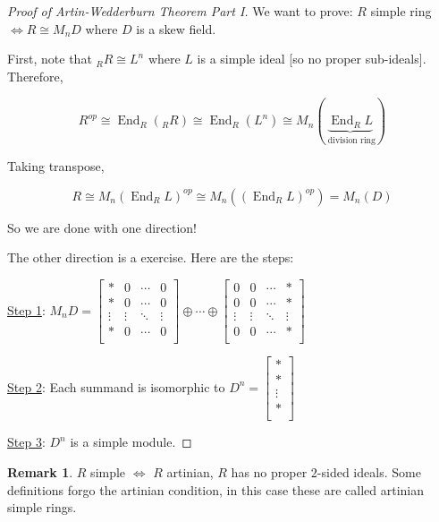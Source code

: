 \documentclass{article}
\theoremstyle{definition}
\newtheorem*{remark}{Remark}
\newcommand{\End}{\operatorname{End}}
\begin{document}
\begin{proof}
    [Proof of Artin-Wedderburn Theorem Part I]

    We want to prove: \(R\) simple ring \(\iff R \cong M_n D\) where \(D\) is a skew field.

    First, note that \(_R R \cong L^n\) where \(L\) is a simple ideal [so no proper sub-ideals]. Therefore,

    \[
        R^{op} \cong  \End_R (_R R) \cong \End_R (L^n) \cong M_n(\underbrace{\End_R L}_{\text{ division ring} })
    \]

    Taking transpose,

    \[
        R \cong M_n(\End_R L)^{op} \cong M_n((\End_R L)^{op}) =M_n(D)
    \]

    So we are done with one direction!

    The other direction is a exercise. Here are the steps:

    \underline{Step 1}: \(M_n D = \begin{bmatrix}
        \ast & 0 & \cdots &  0 \\
        \ast & 0 & \cdots &  0 \\
        \vdots & \vdots & \ddots &  \vdots \\
        \ast & 0 & \cdots &  0 \\
    \end{bmatrix} \oplus \cdots \oplus \begin{bmatrix}
        0 & 0 & \cdots &  \ast \\
        0 & 0 & \cdots &  \ast \\
        \vdots & \vdots & \ddots &  \vdots \\
        0 & 0 & \cdots &  \ast \\
    \end{bmatrix}\) 

    \underline{Step 2}: Each summand is isomorphic to \(D^n = \begin{bmatrix}
         \ast \\
         \ast \\
         \vdots \\
         \ast \\
    \end{bmatrix}\) 

    \underline{Step 3}: \(D^n\) is a simple module.

\end{proof}

\begin{remark}
    \(R\) simple \(\iff\) \(R\) artinian, \(R\) has no proper \(2\)-sided ideals. Some definitions forgo the artinian condition, in this case these are called artinian simple rings.
\end{remark}
\end{document}
